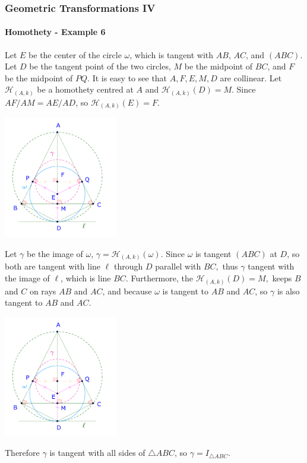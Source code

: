 \documentclass[8pt,xcolor=table,dvipsnames]{beamer}
\begin{document}
\begin{frame}[t]
    \frametitle{Geometric Transformations IV}
    \framesubtitle{Homothety - Example 6}
    \begin{overprint}
        Let $E$ be the center of the circle $\omega$, which is tangent with $AB$, $AC$, and $(ABC)$.
        Let $D$ be the tangent point of the two circles, $M$ be the midpoint of $BC$, and $F$ be the midpoint of $PQ$.
        It is easy to see that $A,F,E,M,D$ are collinear.
        Let $\mathcal{H}_{(A,k)}$ be a homothety centred at $A$ and $\mathcal{H}_{(A,k)}(D)=M.$
        Since $AF/AM = AE/AD$, so $\mathcal{H}_{(A,k)}(E)=F.$
        \begin{center}
            \includegraphics[width=5cm]{./svg/pdf/homothety-p6b.pdf}
        \end{center}
        Let $\gamma$ be the image of $\omega$, $\gamma=\mathcal{H}_{(A,k)}(\omega).$
        Since $\omega$ is tangent $(ABC)$ at $D$, so both are tangent with line $\ell$ through $D$ parallel with $BC,$
        thus $\gamma$ tangent with the image of $\ell$, which is line $BC$.
        Furthermore, the $\mathcal{H}_{(A,k)}(D)=M,$ keeps $B$ and $C$ on rays $AB$ and $AC$, and because $\omega$ is tangent to $AB$ and $AC$,
        so $\gamma$ is also tangent to $AB$ and $AC$.        
        \begin{center}
            \includegraphics[width=5cm]{./svg/pdf/homothety-p6b.pdf}
        \end{center}
        Therefore $\gamma$ is tangent with all sides of $\triangle ABC$, so $\gamma = I_{\triangle ABC}.$


\end{overprint}
\end{frame}
\end{document}
